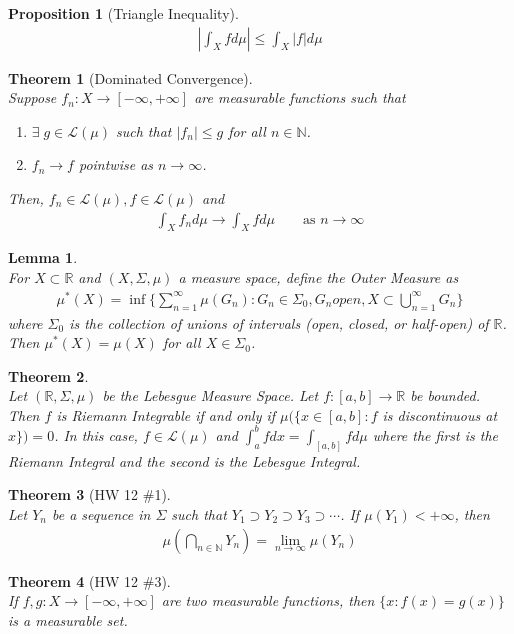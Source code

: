 \documentclass[10pt,a4paper]{article}
\newtheorem{theorem}{Theorem}
\newtheorem{lemma}{Lemma}
\newtheorem{proposition}{Proposition}
\theoremstyle{definition}
\theoremstyle{definition}
\numberwithin{equation}{section}
\numberwithin{theorem}{section}
\numberwithin{proposition}{section}
\numberwithin{lemma}{section}
\numberwithin{corollary}{section}
\begin{document}
\begin{proposition}[Triangle Inequality]$ $
\begin{align*}
\left| \int_X f d\mu \right| \leq \int_X |f| d\mu
\end{align*}
\end{proposition}

\begin{theorem}[Dominated Convergence]$ $
\\Suppose $f_n : X \to [-\infty, +\infty]$ are measurable functions such that 
\begin{enumerate}
\item $\exists \; g \in \mathcal{L}(\mu)$ such that $|f_n| \leq g$ for all $n \in \mathbb{N}$. 
\item $f_n \to f$ pointwise as $n \to \infty$.
\end{enumerate}
Then, $f_n \in \mathcal{L}(\mu), f \in \mathcal{L}(\mu)$ and 
\begin{align*}
\int_X f_n d\mu \to \int_X f d \mu \qquad \text{as $n \to \infty$}
\end{align*}
\end{theorem}

\begin{lemma}$ $
\\For $X \subset \mathbb{R}$ and $(X, \Sigma, \mu)$ a measure space, define the Outer Measure as
\begin{align*}
\mu^*(X) = \inf\{ \sum_{n = 1}^\infty \mu(G_n) : G_n \in \Sigma_0, G_n open, X \subset \bigcup_{n = 1}^\infty G_n \}
\end{align*}
where $\Sigma_0$ is the collection of unions of intervals (open, closed, or half-open) of $\mathbb{R}$. Then $\mu^*(X) = \mu(X)$ for all $X \in \Sigma_0$. 
\end{lemma}

\begin{theorem}$ $
\\Let $(\mathbb{R}, \Sigma, \mu)$ be the Lebesgue Measure Space. Let $f: [a, b] \to \mathbb{R}$ be bounded. Then $f$ is Riemann Integrable if and only if $\mu(\{x \in [a, b] : f$ is discontinuous at $x\}) = 0$. In this case, $f \in \mathcal{L}(\mu)$ and $\int_a^b f dx = \int_{[a, b]} f d\mu$ where the first is the Riemann Integral and the second is the Lebesgue Integral. 
\end{theorem}

\begin{theorem}[HW 12 $\#$1]$ $
\\Let $Y_n$ be a sequence in $\Sigma$ such that $Y_1 \supset Y_2 \supset Y_3 \supset \cdots$. If $\mu(Y_1) < +\infty$, then
\begin{align*}
\mu\left(\bigcap_{n \in \mathbb{N}} Y_n \right) = \lim_{n \to \infty} \mu(Y_n)
\end{align*}
\end{theorem}

\begin{theorem}[HW 12 $\#$3]$ $
\\If $f, g: X \to [-\infty, +\infty]$ are two measurable functions, then $\{x: f(x) = g(x)\}$ is a measurable set. 
\end{theorem}
\end{document}
